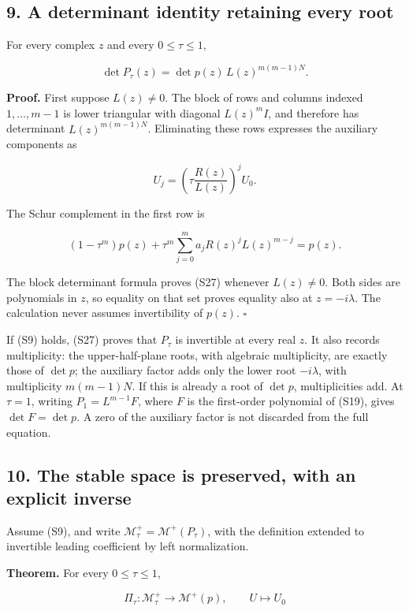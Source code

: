 \documentclass[
  11pt,
]{article}
\begin{document}
\subsection{9. A determinant identity retaining every
root}\label{a-determinant-identity-retaining-every-root}

For every complex \(z\) and every \(0\leq\tau\leq1\),

\[
\det P_\tau(z)=\det p(z)\,L(z)^{m(m-1)N}.                 \tag{S27}
\]

\textbf{Proof.} First suppose \(L(z)\ne0\). The block of rows and
columns indexed \(1,\ldots,m-1\) is lower triangular with diagonal
\(L(z)^m I\), and therefore has determinant \(L(z)^{m(m-1)N}\).
Eliminating these rows expresses the auxiliary components as

\[
U_j=\left(\tau\frac{R(z)}{L(z)}\right)^jU_0.
\]

The Schur complement in the first row is

\[
(1-\tau^m)p(z)
+\tau^m\sum_{j=0}^ma_jR(z)^jL(z)^{m-j}=p(z).
\]

The block determinant formula proves (S27) whenever \(L(z)\ne0\). Both
sides are polynomials in \(z\), so equality on that set proves equality
also at \(z=-i\lambda\). The calculation never assumes invertibility of
\(p(z)\). \(\square\)

If (S9) holds, (S27) proves that \(P_\tau\) is invertible at every real
\(z\). It also records multiplicity: the upper-half-plane roots, with
algebraic multiplicity, are exactly those of \(\det p\); the auxiliary
factor adds only the lower root \(-i\lambda\), with multiplicity
\(m(m-1)N\). If this is already a root of \(\det p\), multiplicities
add. At \(\tau=1\), writing \(P_1=L^{m-1}F\), where \(F\) is the
first-order polynomial of (S19), gives \(\det F=\det p\). A zero of the
auxiliary factor is not discarded from the full equation.

\subsection{10. The stable space is preserved, with an explicit
inverse}\label{the-stable-space-is-preserved-with-an-explicit-inverse}

Assume (S9), and write \(\mathcal M^+_\tau=\mathcal M^+(P_\tau)\), with
the definition extended to invertible leading coefficient by left
normalization.

\textbf{Theorem.} For every \(0\leq\tau\leq1\),

\[
\Pi_\tau:\mathcal M^+_\tau\longrightarrow\mathcal M^+(p),
\qquad U\longmapsto U_0                                  \tag{S28}
\]
\end{document}
